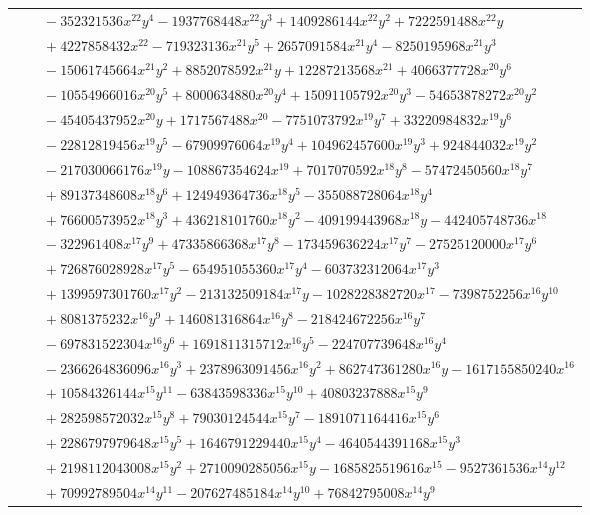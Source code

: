 \documentclass[11pt]{article}
\begin{document}
\begin{longtable}{@{}ll@{}}
 & $\quad -352321536x^{22}y^{4}-1937768448x^{22}y^{3}+1409286144x^{22}y^{2}+7222591488x^{22}y$\\
 & $\quad +4227858432x^{22}-719323136x^{21}y^{5}+2657091584x^{21}y^{4}-8250195968x^{21}y^{3}$\\
 & $\quad -15061745664x^{21}y^{2}+8852078592x^{21}y+12287213568x^{21}+4066377728x^{20}y^{6}$\\
 & $\quad -10554966016x^{20}y^{5}+8000634880x^{20}y^{4}+15091105792x^{20}y^{3}-54653878272x^{20}y^{2}$\\
 & $\quad -45405437952x^{20}y+1717567488x^{20}-7751073792x^{19}y^{7}+33220984832x^{19}y^{6}$\\
 & $\quad -22812819456x^{19}y^{5}-67909976064x^{19}y^{4}+104962457600x^{19}y^{3}+924844032x^{19}y^{2}$\\
 & $\quad -217030066176x^{19}y-108867354624x^{19}+7017070592x^{18}y^{8}-57472450560x^{18}y^{7}$\\
 & $\quad +89137348608x^{18}y^{6}+124949364736x^{18}y^{5}-355088728064x^{18}y^{4}$\\
 & $\quad +76600573952x^{18}y^{3}+436218101760x^{18}y^{2}-409199443968x^{18}y-442405748736x^{18}$\\
 & $\quad -322961408x^{17}y^{9}+47335866368x^{17}y^{8}-173459636224x^{17}y^{7}-27525120000x^{17}y^{6}$\\
 & $\quad +726876028928x^{17}y^{5}-654951055360x^{17}y^{4}-603732312064x^{17}y^{3}$\\
 & $\quad +1399597301760x^{17}y^{2}-213132509184x^{17}y-1028228382720x^{17}-7398752256x^{16}y^{10}$\\
 & $\quad +8081375232x^{16}y^{9}+146081316864x^{16}y^{8}-218424672256x^{16}y^{7}$\\
 & $\quad -697831522304x^{16}y^{6}+1691811315712x^{16}y^{5}-224707739648x^{16}y^{4}$\\
 & $\quad -2366264836096x^{16}y^{3}+2378963091456x^{16}y^{2}+862747361280x^{16}y-1617155850240x^{16}$\\
 & $\quad +10584326144x^{15}y^{11}-63843598336x^{15}y^{10}+40803237888x^{15}y^{9}$\\
 & $\quad +282598572032x^{15}y^{8}+79030124544x^{15}y^{7}-1891071164416x^{15}y^{6}$\\
 & $\quad +2286797979648x^{15}y^{5}+1646791229440x^{15}y^{4}-4640544391168x^{15}y^{3}$\\
 & $\quad +2198112043008x^{15}y^{2}+2710090285056x^{15}y-1685825519616x^{15}-9527361536x^{14}y^{12}$\\
 & $\quad +70992789504x^{14}y^{11}-207627485184x^{14}y^{10}+76842795008x^{14}y^{9}$\\

\end{longtable}
\end{document}

